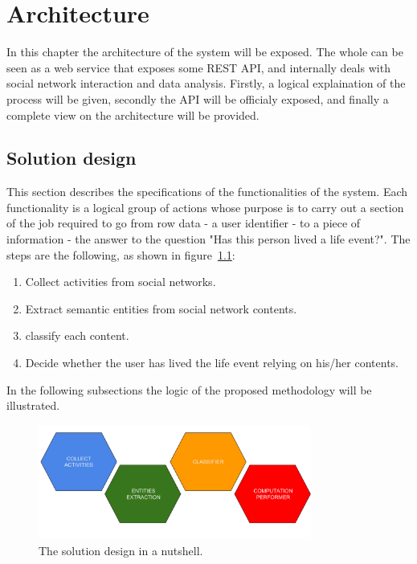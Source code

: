\chapter{Architecture}
\label{cha:architecture}

In this chapter the architecture of the system will be exposed. The whole can be seen as a web service that exposes some REST API, and internally deals with social network interaction and data analysis. Firstly, a logical explaination of the process will be given, secondly the API will be officialy exposed, and finally a complete view on the architecture will be provided.

\section{Solution design}
\label{sec:design}
This section describes the specifications of the functionalities of the system. Each functionality is a logical group of actions whose purpose is to carry out a section of the job required to go from row data - a user identifier - to a piece of information - the answer to the question "Has this person lived a life event?". The steps are the following, as shown in figure~\ref{fig:nutshell}:
\begin{enumerate}
\item Collect activities from social networks.
\item Extract semantic entities from social network contents.
\item classify each content.
\item Decide whether the user has lived the life event relying on his/her contents.
\end{enumerate}
In the following subsections the logic of the proposed methodology will be illustrated.

\begin{figure}
\centering
\includegraphics[width=%
0.8\textwidth]{img/Solutiondesign_nutshell}
\caption{The solution design in a nutshell.}
\label{fig:nutshell}
\end{figure}

